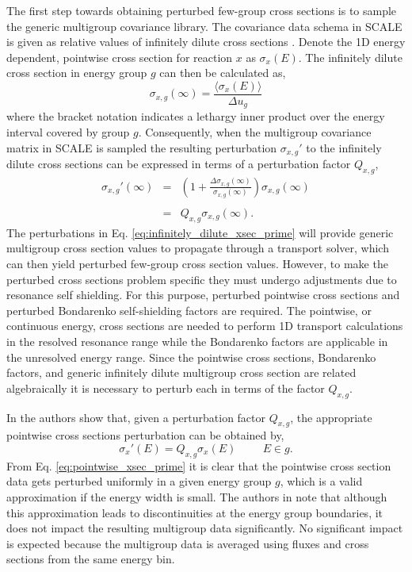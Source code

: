 The first step towards obtaining perturbed few-group cross sections is to sample the generic multigroup covariance library. The covariance data schema in \ac{SCALE} is given as relative values of infinitely dilute cross sections \cite{Williams_Ilas}. Denote the 1D energy dependent, pointwise cross section for reaction $x$ as $\sigma_x(E)$. The infinitely dilute cross section in energy group $g$ can then be calculated as,
\begin{equation}
\label{eq:infinitely_dilute_xsec}
   \sigma_{x,g}(\infty) = \frac{\langle\sigma_x(E)\rangle}
    {\Delta u_g}   
\end{equation}  
where the bracket notation indicates a lethargy inner product over the energy interval covered by group $g$. Consequently, when the multigroup covariance matrix in \ac{SCALE} is sampled the resulting perturbation $\sigma_{x,g}'$ to the infinitely dilute cross sections can be expressed in terms of a perturbation factor $Q_{x,g}$,
\begin{eqnarray}
\label{eq:infinitely_dilute_xsec_prime}
   \sigma_{x,g}'(\infty) &=& \left(1 + \frac{\Delta\sigma_{x,g}(\infty)}
    {\sigma_{x,g}(\infty)}\right)\sigma_{x,g}(\infty) \nonumber \\
     \nonumber \\
      &=& Q_{x,g}\sigma_{x,g}(\infty). 
\end{eqnarray}  
The perturbations in Eq. \ref{eq:infinitely_dilute_xsec_prime} will provide generic multigroup cross section values to propagate through a transport solver, which can then yield perturbed few-group cross section values. However, to make the perturbed cross sections problem specific they must undergo adjustments due to resonance self shielding. For this purpose, perturbed pointwise cross sections and perturbed Bondarenko self-shielding factors are required. The pointwise, or continuous energy, cross sections are needed to perform 1D transport calculations in the resolved resonance range while the Bondarenko factors are applicable in the unresolved energy range. Since the pointwise cross sections, Bondarenko factors, and generic infinitely dilute multigroup cross section are related algebraically it is necessary to perturb each in terms of the factor $Q_{x,g}$. 

In \cite{Williams_Ilas} the authors show that, given a perturbation factor $Q_{x,g}$, the appropriate pointwise cross sections perturbation can be obtained by,
\begin{equation}
\label{eq:pointwise_xsec_prime}
   \sigma_x'(E) = Q_{x,g}\sigma_x(E) \hspace{1cm} E\in g.
\end{equation} 
From Eq. \ref{eq:pointwise_xsec_prime} it is clear that the pointwise cross section data gets perturbed uniformly in a given energy group $g$, which is a valid approximation if the energy width is small. The authors in \cite{Williams_Ilas} note that although this approximation leads to discontinuities at the energy group boundaries, it does not impact the resulting multigroup data significantly. No significant impact is expected because the multigroup data is averaged using fluxes and cross sections from the same energy bin. 

